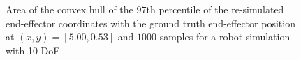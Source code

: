 \documentclass[conference]{IEEEtran}
\begin{document}
\begin{figure}[tbh]
\centering

    \caption{Area of the convex hull of the \(97\)th percentile of the re-simulated end-effector coordinates with the ground truth end-effector position at $(x, y) = [5.00, 0.53]$ and $1000$ samples for a robot simulation with 10 DoF.}
    \label{fig:q_quantile:10DOF}
\end{figure}
\end{document}
